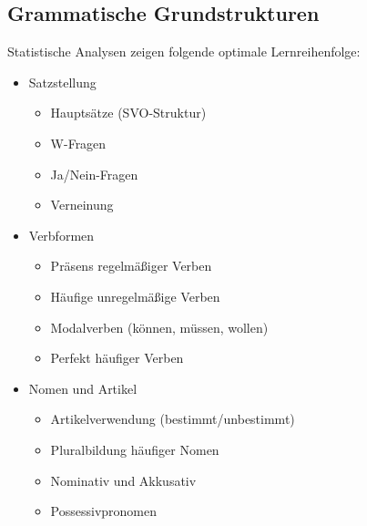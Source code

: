 \subsection{Grammatische Grundstrukturen}
Statistische Analysen zeigen folgende optimale Lernreihenfolge:
\begin{itemize}
    \item Satzstellung
    \begin{itemize}
        \item Hauptsätze (SVO-Struktur)
        \item W-Fragen
        \item Ja/Nein-Fragen
        \item Verneinung
    \end{itemize}
    
    \item Verbformen
    \begin{itemize}
        \item Präsens regelmäßiger Verben
        \item Häufige unregelmäßige Verben
        \item Modalverben (können, müssen, wollen)
        \item Perfekt häufiger Verben
    \end{itemize}
    
    \item Nomen und Artikel
    \begin{itemize}
        \item Artikelverwendung (bestimmt/unbestimmt)
        \item Pluralbildung häufiger Nomen
        \item Nominativ und Akkusativ
        \item Possessivpronomen
    \end{itemize}
\end{itemize}

